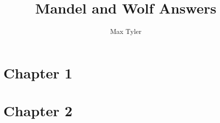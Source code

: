 \documentclass{report}
\title{Mandel and Wolf Answers}
\author{Max Tyler}
\begin{document}
\maketitle
\tableofcontents

\section{Chapter 1}

\section{Chapter 2}

\end{document}
